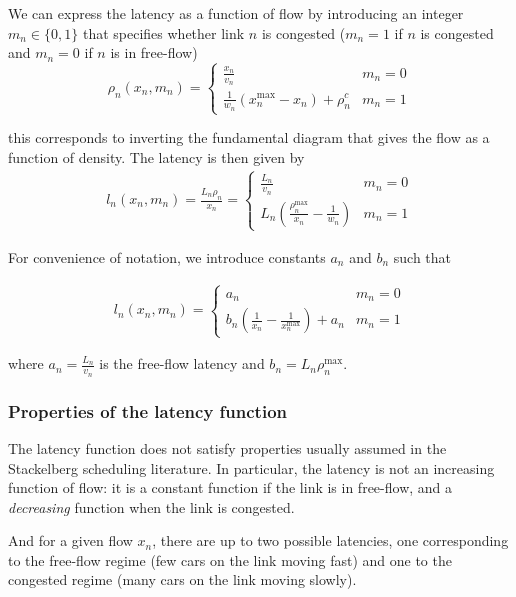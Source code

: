 We can express the latency as a function of flow by introducing an integer $m_n \in \{0, 1\}$ that specifies whether link $n$ is congested ($m_n = 1$ if $n$ is congested and $m_n = 0$ if $n$ is in free-flow)
\[
\rho_n(x_n, m_n) = \begin{cases}
\frac{x_n}{v_n} & m_n = 0 \\
\frac{1}{w_n}(x_n^{\max} - x_n) + \rho_n^c & m_n = 1
\end{cases}
\]

this corresponds to inverting the fundamental diagram that gives the flow as a function of density. The latency is then given by
\begin{align*}
l_n(x_n, m_n) =  \frac{L_n\rho_n}{x_n} = \begin{cases}
\frac{L_n}{v_n} & m_n = 0\\
L_n \left( \frac{\rho_n^{\max}}{x_n} - \frac{1}{w_n} \right) & m_n = 1
\end{cases}
\end{align*}

For convenience of notation, we introduce constants $a_n$ and $b_n$ such that

\begin{align}
\label{eq:latency}
l_n(x_n, m_n) = \begin{cases}
a_n & m_n = 0\\
b_n \left( \frac{1}{x_n} - \frac{1}{x^{\max}_n} \right) + a_n & m_n = 1
\end{cases}
\end{align}

where $a_n = \frac{L_n}{v_n}$ is the free-flow latency and $b_n = L_n\rho_n^{\max}$.

\subsubsection{Properties of the latency function}
The latency function does not satisfy properties usually assumed in the Stackelberg scheduling literature. In particular, the latency is not an increasing function of flow: it is a constant function if the link is in free-flow, and a \emph{decreasing} function when the link is congested.

And for a given flow $x_n$, there are up to two possible latencies, one corresponding to the free-flow regime (few cars on the link moving fast) and one to the congested regime (many cars on the link moving slowly).

